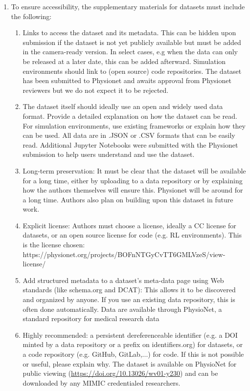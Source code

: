 \begin{enumerate}
\item To ensure accessibility, the supplementary materials for datasets must include the following:
\begin{enumerate}
  \item Links to access the dataset and its metadata. This can be hidden upon submission if the dataset is not yet publicly available but must be added in the camera-ready version. In select cases, e.g when the data can only be released at a later date, this can be added afterward. Simulation environments should link to (open source) code repositories. \answerYes{} The dataset has been submitted to Physionet and awaits approval from Physionet reviewers but we do not expect it to be rejected. 
  \item The dataset itself should ideally use an open and widely used data format. Provide a detailed explanation on how the dataset can be read. For simulation environments, use existing frameworks or explain how they can be used. \answerYes{} All data are in .JSON or .CSV formats that can be easily read. Additional Jupyter Notebooks were submitted with the Physionet submission to help users understand and use the dataset.
  \item Long-term preservation: It must be clear that the dataset will be available for a long time, either by uploading to a data repository or by explaining how the authors themselves will ensure this. \answerYes{} Physionet will be around for a long time. Authors also plan on building upon this dataset in future work.
  \item Explicit license: Authors must choose a license, ideally a CC license for datasets, or an open source license for code (e.g. RL environments). \answerYes{} This is the license chosen: https://physionet.org/projects/BOFnNTGyCvTT6GMLVzeS/view-license/
  \item Add structured metadata to a dataset's meta-data page using Web standards (like schema.org and DCAT): This allows it to be discovered and organized by anyone. If you use an existing data repository, this is often done automatically. \answerYes{} Data are available through PhysioNet, a standard repository for medical research data
  \item Highly recommended: a persistent dereferenceable identifier (e.g. a DOI minted by a data repository or a prefix on identifiers.org) for datasets, or a code repository (e.g. GitHub, GitLab,...) for code. If this is not possible or useful, please explain why. \answerYes{} The dataset is available on PhysioNet for public viewing (\url{https://doi.org/10.13026/wv01-y230}) and can be downloaded by any MIMIC credentialed researchers.
\end{enumerate}


\end{enumerate}
